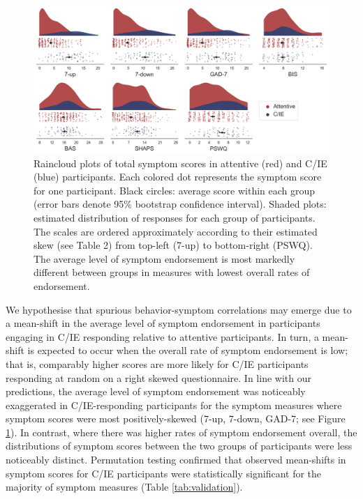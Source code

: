 \documentclass[a4paper,notitlepage,12pt]{article}
\begin{document}
\begin{refsection}[main]
\begin{figure}[t!]
\includegraphics[width=16cm]{../figures/main_02a.png}
\centering
\captionsetup{width=0.88\textwidth}
\caption{Raincloud plots of total symptom scores in attentive (red) and C/IE (blue) participants. Each colored dot represents the symptom score for one participant. Black circles: average score within each group (error bars denote 95\% bootstrap confidence interval). Shaded plots: estimated distribution of responses for each group of participants. The scales are ordered approximately according to their estimated skew (see Table 2) from top-left (7-up) to bottom-right (PSWQ). The average level of symptom endorsement is most markedly different between groups in measures with lowest overall rates of endorsement.}
\label{fig:distributions}
\end{figure}

We hypothesise that spurious behavior-symptom correlations may emerge due to a mean-shift in the average level of symptom endorsement in participants engaging in C/IE responding relative to attentive participants. In turn, a mean-shift is expected to occur when the overall rate of symptom endorsement is low; that is, comparably higher scores are more likely for C/IE participants responding at random on a right skewed questionnaire. In line with our predictions, the average level of symptom endorsement was noticeably exaggerated in C/IE-responding participants for the symptom measures where symptom scores were most positively-skewed (7-up, 7-down, GAD-7; see Figure \ref{fig:distributions}). In contrast, where there was higher rates of symptom endorsement overall, the distributions of symptom scores between the two groups of participants were less noticeably distinct. Permutation testing confirmed that observed mean-shifts in symptom scores for C/IE participants were statistically significant for the majority of symptom measures (Table \ref{tab:validation}).


\end{refsection}
\end{document}
